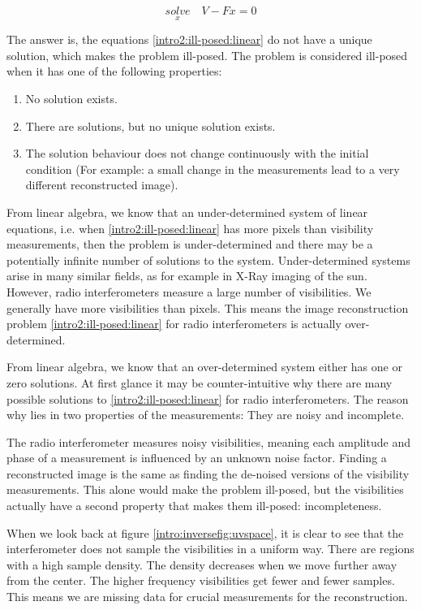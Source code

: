 \begin{equation}\label{intro2:ill-posed:linear}
\underset{x}{solve}\quad V - Fx = 0
\end{equation}

The answer is, the equations \eqref{intro2:ill-posed:linear} do not have a unique solution, which makes the problem ill-posed. The problem is considered ill-posed when it has one of the following properties:
\begin{enumerate}
	\item No solution exists.
	\item There are solutions, but no unique solution exists.
	\item The solution behaviour does not change continuously with the initial condition (For example: a small change in the measurements lead to a very different reconstructed image).
\end{enumerate}
From linear algebra, we know that an under-determined system of linear equations, i.e. when \eqref{intro2:ill-posed:linear} has more pixels than visibility measurements, then the problem is under-determined and there may be a potentially infinite number of solutions to the system. Under-determined systems arise in many similar fields, as for example in X-Ray imaging of the sun\cite{felix2017compressed}. However, radio interferometers measure a large number of visibilities. We generally have more visibilities than pixels. This means the image reconstruction problem \eqref{intro2:ill-posed:linear} for radio interferometers is actually over-determined.

From linear algebra, we know that an over-determined system either has one or zero solutions. At first glance it may be counter-intuitive why there are many possible solutions to \eqref{intro2:ill-posed:linear} for radio interferometers. The reason why lies in two properties of the measurements: They are noisy and incomplete.

The radio interferometer measures noisy visibilities, meaning each amplitude and phase of a measurement is influenced by an unknown noise factor. Finding a reconstructed image is the same as finding the de-noised versions of the visibility measurements. This alone would make the problem ill-posed, but the visibilities actually have a second property that makes them ill-posed: incompleteness.

When we look back at figure \ref{intro:inversefig:uvspace}, it is clear to see that the interferometer does not sample the visibilities in a uniform way. There are regions with a high sample density. The density decreases when we move further away from the center. The higher frequency visibilities get fewer and fewer samples. This means we are missing data for crucial measurements for the reconstruction.

